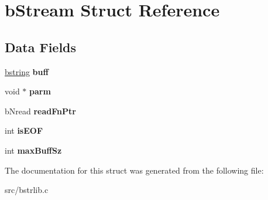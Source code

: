 \hypertarget{structbStream}{}\section{b\+Stream Struct Reference}
\label{structbStream}
\subsection*{Data Fields}
\begin{DoxyCompactItemize}
\item 
\hypertarget{structbStream_aba3294390fa40724b5762adf073c1b86}{}\hyperlink{structtagbstring}{bstring} {\bfseries buff}\label{structbStream_aba3294390fa40724b5762adf073c1b86}

\item 
\hypertarget{structbStream_a43b389e3157aea7f84ba553ad7b24e3e}{}void $\ast$ {\bfseries parm}\label{structbStream_a43b389e3157aea7f84ba553ad7b24e3e}

\item 
\hypertarget{structbStream_a4279a6d91f9df1f4f3dc157d18479491}{}b\+Nread {\bfseries read\+Fn\+Ptr}\label{structbStream_a4279a6d91f9df1f4f3dc157d18479491}

\item 
\hypertarget{structbStream_a7d014819731e1d0415ba4ff92e80ffda}{}int {\bfseries is\+E\+O\+F}\label{structbStream_a7d014819731e1d0415ba4ff92e80ffda}

\item 
\hypertarget{structbStream_a952ac9807d96d9d1dc510ed4bdc8b257}{}int {\bfseries max\+Buff\+Sz}\label{structbStream_a952ac9807d96d9d1dc510ed4bdc8b257}

\end{DoxyCompactItemize}


The documentation for this struct was generated from the following file\+:\begin{DoxyCompactItemize}
\item 
src/bstrlib.\+c\end{DoxyCompactItemize}
